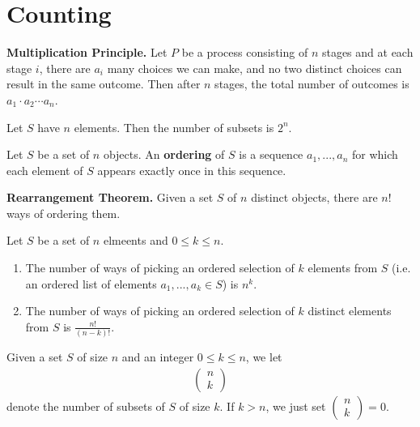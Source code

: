 \documentclass{article}
\begin{document}
\section{Counting}
\begin{theorem}
    \textbf{Multiplication Principle.} Let $P$ be a process consisting of $n$ stages and at each stage $i$, there are $a_i$ many choices we can make, and no two distinct choices can result in the same outcome.
    Then after $n$ stages, the total number of outcomes is $a_1\cdot a_2\cdots a_n$.
\end{theorem}
\begin{proposition}
    Let $S$ have $n$ elements. Then the number of subsets is $2^n$.
\end{proposition}
\begin{definition}
    Let $S$ be a set of $n$ objects. An \textbf{ordering} of $S$ is a sequence $a_1,...,a_n$ for which each element of $S$ appears exactly once in this sequence.
\end{definition}
\begin{theorem}
    \textbf{Rearrangement Theorem.} Given a set $S$ of $n$ distinct objects, there are $n!$ ways of ordering them.
\end{theorem}
\begin{proposition}
    Let $S$ be a set of $n$ elmeents and $0\leq k \leq n$.
    \begin{enumerate}
        \item The number of ways of picking an ordered selection of $k$ elements from $S$ (i.e. an ordered list of elements $a_1, ..., a_k\in S$) is $n^k$.
        \item The number of ways of picking an ordered selection of $k$ distinct elements from $S$ is $\frac{n!}{(n-k)!}$.
    \end{enumerate}
\end{proposition}
\begin{definition}
    Given a set $S$ of size $n$ and an integer $0\leq k \leq n$, we let
    \begin{align*}
        \begin{pmatrix}
            n \\k
        \end{pmatrix}
    \end{align*}
    denote the number of subsets of $S$ of size $k$. If $k>n$, we just set $\begin{pmatrix}
            n \\k
        \end{pmatrix}=0$.
\end{definition}
\end{document}
